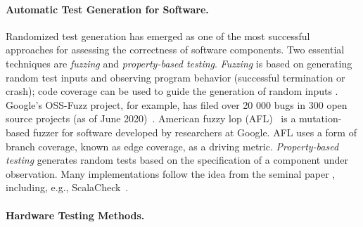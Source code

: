 \documentclass[fleqn,12pt]{article}
\begin{document}
\paragraph{Automatic Test Generation for Software.}
Randomized test generation has emerged as one of the most successful approaches
for assessing the correctness of software components.
Two essential techniques are \emph{fuzzing} and \emph{property-based testing}.
\emph{Fuzzing} is based on generating random test inputs and observing program
behavior (successful termination or crash); code coverage can be used to
guide the generation of random inputs \cite{takanen2018fuzzing,DBLP:journals/tse/BohmePR19,DBLP:conf/pldi/FuS17}.
Google's OSS-Fuzz project, for example, has filed over 20 000 bugs in 300 open source
projects (as of June 2020)~\cite{web:oss-fuzz}.
American fuzzy lop (AFL)~\cite{afl:repo} is a mutation-based fuzzer for software developed by researchers at Google. 
AFL uses a form of branch coverage, known as edge coverage, as a driving metric.
\emph{Property-based testing} generates random tests based on the specification of a component under observation.
Many implementations follow the idea from the seminal paper \cite{DBLP:conf/icfp/ClaessenH00}, including, e.g., ScalaCheck~\cite{nilsson2014scalacheck}.


\paragraph{Hardware Testing Methods.}
\end{document}

